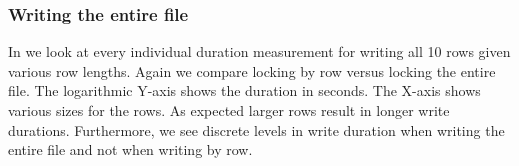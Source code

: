 \clearpage
\subsubsection*{Writing the entire file}
In  we look at every individual duration measurement for writing all 10 rows given various row lengths. Again we compare locking by row versus locking the entire file. The logarithmic Y-axis shows the duration in seconds. The X-axis shows various sizes for the rows. As expected larger rows result in longer write durations. Furthermore, we see discrete levels in write duration when writing the entire file and not when writing by row.
%

